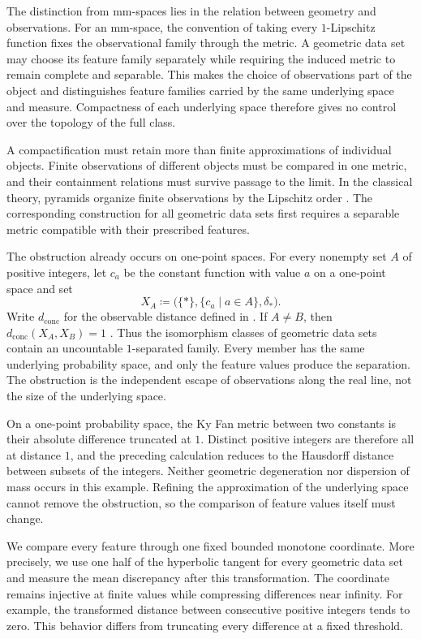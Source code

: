 \documentclass[11pt]{amsart}
\theoremstyle{plain}
\theoremstyle{definition}
\theoremstyle{remark}
\newcommand{\dconc}{d_{\mathrm{conc}}}
\begin{document}
The distinction from mm-spaces lies in the relation between geometry and observations. For an mm-space, the convention of taking every $1$-Lipschitz function fixes the observational family through the metric. A geometric data set may choose its feature family separately while requiring the induced metric to remain complete and separable. This makes the choice of observations part of the object and distinguishes feature families carried by the same underlying space and measure. Compactness of each underlying space therefore gives no control over the topology of the full class.

A compactification must retain more than finite approximations of individual objects. Finite observations of different objects must be compared in one metric, and their containment relations must survive passage to the limit. In the classical theory, pyramids organize finite observations by the Lipschitz order \cite[Definitions~6.3--6.4]{shioya2016mmg}. The corresponding construction for all geometric data sets first requires a separable metric compatible with their prescribed features.

The obstruction already occurs on one-point spaces. For every nonempty set $A$ of positive integers, let $c_a$ be the constant function with value $a$ on a one-point space and set
\[X_A\coloneqq\bigl(\{*\},\{c_a\mid a\in A\},\delta_*\bigr).\]
Write $\dconc$ for the observable distance defined in . If $A\neq B$, then $\dconc(X_A,X_B)=1$ \cite[Theorem~1.1]{gds1}. Thus the isomorphism classes of geometric data sets contain an uncountable $1$-separated family. Every member has the same underlying probability space, and only the feature values produce the separation. The obstruction is the independent escape of observations along the real line, not the size of the underlying space.

On a one-point probability space, the Ky Fan metric \cite[Definition~1.23]{shioya2016mmg} between two constants is their absolute difference truncated at $1$. Distinct positive integers are therefore all at distance $1$, and the preceding calculation reduces to the Hausdorff distance between subsets of the integers. Neither geometric degeneration nor dispersion of mass occurs in this example. Refining the approximation of the underlying space cannot remove the obstruction, so the comparison of feature values itself must change.

We compare every feature through one fixed bounded monotone coordinate. More precisely, we use one half of the hyperbolic tangent for every geometric data set and measure the mean discrepancy after this transformation. The coordinate remains injective at finite values while compressing differences near infinity. For example, the transformed distance between consecutive positive integers tends to zero. This behavior differs from truncating every difference at a fixed threshold.
\end{document}
